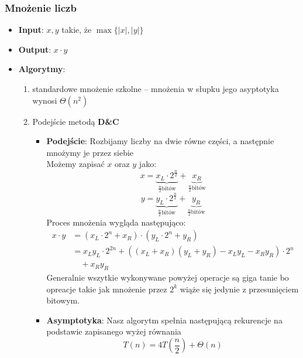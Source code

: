 \documentclass[11pt,a4paper]{article}
\begin{document}
\subsubsection{Mnożenie liczb}
\begin{itemize}
    \item \textbf{Input}: $x, y$ takie, że $\max\{|x|, |y|\}$
    \item \textbf{Output}: $x \cdot y$
    \item \textbf{Algorytmy}:
        \begin{enumerate}
            \item standardowe mnożenie szkolne -- mnożenia w słupku jego asyptotyka wynosi $\Theta(n^2)$
            \item Podejście metodą \textbf{D\&C}
                \begin{itemize}
                    \item \textbf{Podejście}: Rozbijamy liczby na dwie równe części, a następnie mnożymy je przez siebie \\
                        Możemy zapisać $x$ oraz $y$ jako:
                        \[
                            x = \underbrace{x_L \cdot 2^{\frac{n}{2}}}_{\frac{n}{2} \text{bitów}} +\underbrace{x_R}_{\frac{n}{2} \text{bitów}}
                        \]
                        \[
                            y = \underbrace{y_L \cdot 2^{\frac{n}{2}}}_{\frac{n}{2} \text{bitów}} +\underbrace{y_R}_{\frac{n}{2} \text{bitów}}
                        \]
                        Proces mnożenia wygląda następująco:
                        \begin{equation*}\begin{split}
                            x \cdot y &= (x_L \cdot 2^n + x_R) \cdot (y_L \cdot 2^n + y_R) \\
                                      &= x_L y_L \cdot 2^{2n} + ((x_L + x_R)(y_L + y_R) - x_L y_L - x_R y_R) \cdot 2^n \\
                                      &\quad + x_R y_R
                        \end{split}\end{equation*}
                        Generalnie wszytkie wykonywane powyżej operacje są giga tanie bo opreacje takie jak mnożenie przez $2^k$ wiąże się jedynie z przesunięciem bitowym.
                    \item \textbf{Asymptotyka}: Nasz algorytm spełnia następującą rekurencje na podstawie zapisanego wyżej równania
                        \[
                            T(n) = 4T(\frac{n}{2}) + \Theta(n)
\]
\end{itemize}
\end{enumerate}
\end{itemize}
\end{document}
